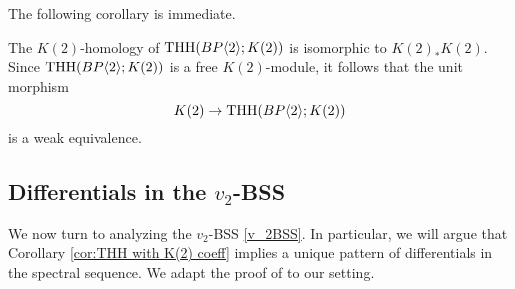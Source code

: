 \begin{comment}
Now, consider the Eilenberg-Moore spectral sequence 
\[
E^2_{s,t}\Tor^{K(2)_*\B}_{s,t}(K(2)_*K(2), K(2)_*\THH(\B))\implies K(2)_{s+t}(\THH(\B;K(2))).
\]
By the theorem, the $E^2$-term is isomorphic to 
\[
\Tor^{K(2)_*\B}(K(2)_*K(2), K(2)_*\B).
\]
Consequently the spectral sequence collapses to the $0$-line and $E_{*,*}^{\infty}\cong K(2)_*K(2)$. This proves the following corollary.
\end{comment}
The following corollary is immediate.
\begin{cor}\label{cor:THH with K(2) coeff}
	The $K(2)$-homology of $\operatorname{THH}(BP\langle 2 \rangle;K(2))$ is isomorphic to $K(2)_*K(2)$. Since $\operatorname{THH}(BP\langle 2 \rangle;K(2))$ is a free $K(2)$-module, it follows that the unit morphism
	\[
	K(2)\to \operatorname{THH}(BP\langle 2 \rangle;K(2))
	\]
	is a weak equivalence.
\end{cor}

\subsection{Differentials in the $v_2$-BSS}
We now turn to analyzing the $v_2$-BSS \eqref{v_2BSS}. In particular, we will argue that Corollary \ref{cor:THH with K(2) coeff} implies a unique pattern of differentials in the spectral sequence. We adapt the proof of \cite{McClureStaffeldt} to our setting. 

